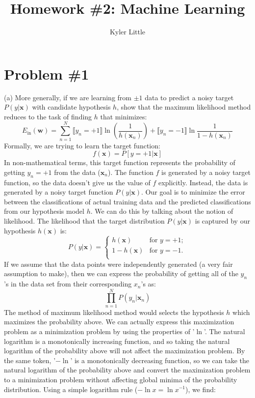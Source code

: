 \documentclass[12pt]{article}
\author{Kyler Little}
\title{Homework \#2: Machine Learning}
\begin{document}
	\maketitle
	\section*{Problem \#1}
	(a) More generally, if we are learning from $\pm1$ data to predict a noisy target $P({y|\boldsymbol{x}})$ with candidate hypothesis $h$, show that the maximum likelihood method reduces to the task of finding $h$ that minimizes:
	\begin{equation*}
	E_{\text{in}}(\boldsymbol{w})= \sum_{n=1}^{N} \llbracket y_n=+1\rrbracket \ln(\frac{1}{h(\boldsymbol{x}_n)}) + \llbracket y_n=-1\rrbracket \ln \frac{1}{1-h(\boldsymbol{x}_n)}
	\end{equation*}
	Formally, we are trying to learn the target function:
	\begin{equation*}
	f(\boldsymbol{x}) = P[y=+1|\boldsymbol{x}]
	\end{equation*} 
	In non-mathematical terms, this target function represents the probability of getting $y_n=+1$ from the data ($\boldsymbol{x}_n$). The function $f$ is generated by a noisy target function, so the data doesn't give us the value of $f$ explicitly. Instead, the data is generated by a noisy target function $P(y|\boldsymbol{x})$. Our goal is to minimize the error between the classifications of actual training data and the predicted classifications from our hypothesis model $h$. We can do this by talking about the notion of likelihood. The likelihood that the target distribution $P(y|\boldsymbol{x})$ is captured by our hypothesis $h(\boldsymbol{x})$ is:
	\begin{equation*}
	P(y|\boldsymbol{x}) = 
	\begin{cases}
	h(\boldsymbol{x}) & \text{for } y=+1; \\
	1-h(\boldsymbol{x}) & \text{for } y=-1. \\
	\end{cases}
	\end{equation*}
	If we assume that the data points were independently generated (a very fair assumption to make), then we can express the probability of getting all of the $y_n$'s in the data set from their corresponding $x_n$'s as:
	\begin{equation*}
	\prod_{n=1}^{N} P(y_n|\boldsymbol{x}_n) 
	\end{equation*}
	The method of maximum likelihood method would selects the hypothesis $h$ which maximizes the probability above. We can actually express this maximization problem as a minimization problem by using the properties of '$\ln$'. The natural logarithm is a monotonically increasing function, and so taking the natural logarithm of the probability above will not affect the maximization problem. By the same token, '$-\ln$' is a monotonically decreasing function, so we can take the natural logarithm of the probability above and convert the maximization problem to a minimization problem without affecting global minima of the probability distribution. Using a simple logarithm rule ($-\ln x =\ln x^{-1}$), we find:
\end{document}
